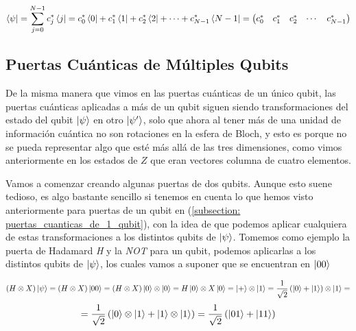 \documentclass[12pt]{article}
\numberwithin{equation}{section} %
\begin{document}
    \begin{equation}
        \bra{\psi} = \sum_{j = 0}^{N - 1} c_{j}^{*} \bra{j} = c_{0}^{*} \bra{0} + c_{1}^{*} \bra{1} + c_{2}^{*} \bra{2} + \cdots + c_{N - 1}^{*} \bra{N - 1} = \begin{pmatrix}
            c_{0}^{*} & c_{1}^{*} & c_{2}^{*} & \cdots & c_{N - 1}^{*}
        \end{pmatrix}
        \label{eq: bra_qubit_dimension_N_matriz}
    \end{equation}

    \vspace{10mm}

    


    \subsection{Puertas Cuánticas de Múltiples Qubits}\label{subsection: puertas_cuanticas_multiples_qubits}

    \vspace{5mm}

    De la misma manera que vimos en las puertas cuánticas de un único qubit, las puertas cuánticas aplicadas a más de un qubit siguen siendo transformaciones del estado del qubit \( \ket{\psi} \) en otro \( \ket{\psi'} \), solo que ahora al tener más de una unidad de información cuántica no son rotaciones en la esfera de Bloch, y esto es porque no se pueda representar algo que esté más allá de las tres dimensiones, como vimos anteriormente en los estados de \( Z \) que eran vectores columna de cuatro elementos.

    \vspace{5mm}

    Vamos a comenzar creando algunas puertas de dos qubits. Aunque esto suene tedioso, es algo bastante sencillo si tenemos en cuenta lo que hemos visto anteriormente para puertas de un qubit en (\ref{subsection: puertas_cuanticas_de_1_qubit}), con la idea de que podemos aplicar cualquiera de estas transformaciones a los distintos qubits de \( \ket{\psi} \). Tomemos como ejemplo la puerta de Hadamard \textit{H} y la \textit{NOT} para un qubit, podemos aplicarlas a los distintos qubits de \( \ket{\psi} \), los cuales vamos a suponer que se encuentran en \( \ket{0 0} \)

    \begin{equation*}
        (H \otimes X) \ket{\psi} = (H \otimes X) \ket{0 0} = (H \otimes X) \ket{0} \otimes \ket{0} = H \ket{0} \otimes X \ket{0} = \ket{+} \otimes \ket{1} = \frac{1}{\sqrt{2}} \left( \ket{0} + \ket{1} \right) \otimes \ket{1} =
    \end{equation*}
    \begin{equation*}
        = \frac{1}{\sqrt{2}} \left( \ket{0} \otimes \ket{1} + \ket{1} \otimes \ket{1} \right) = \frac{1}{\sqrt{2}} \left( \ket{0 1} + \ket{1 1} \right)
    \end{equation*}
\end{document}

